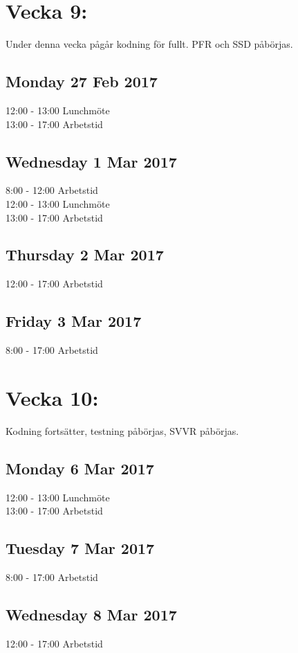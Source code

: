 \documentclass[paper=a4, fontsize=11pt,twoside]{article}
\begin{document}
\section*{Vecka 9:}
Under denna vecka pågår kodning för fullt. PFR och SSD påbörjas.\\
\subsection*{Monday 27 Feb 2017}
	12:00 - 13:00 Lunchmöte\\
	13:00 - 17:00 Arbetstid\\
\subsection*{Wednesday 1 Mar 2017}
	8:00 - 12:00 Arbetstid\\
	12:00 - 13:00 Lunchmöte\\
	13:00 - 17:00 Arbetstid\\
\subsection*{Thursday 2 Mar 2017}
	12:00 - 17:00 Arbetstid\\
\subsection*{Friday 3 Mar 2017}
	8:00 - 17:00 Arbetstid\\



\section*{Vecka 10:}
Kodning fortsätter, testning påbörjas, SVVR påbörjas.\\
\subsection*{Monday 6 Mar 2017}
	12:00 - 13:00 Lunchmöte\\
	13:00 - 17:00 Arbetstid\\
\subsection*{Tuesday 7 Mar 2017}
	8:00 - 17:00 Arbetstid\\
\subsection*{Wednesday 8 Mar 2017}
	12:00 - 17:00 Arbetstid\\
\end{document}
